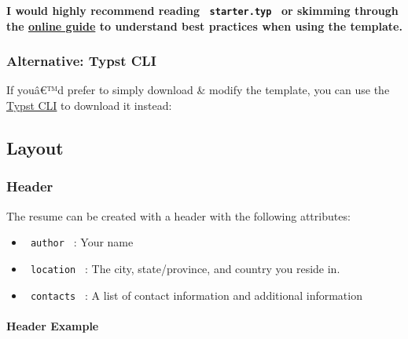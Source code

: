 \textbf{I would highly recommend reading \texttt{\ starter.typ\ } or
skimming through the
\href{https://blog.chaoticgood.computer/writing/notes/typst-resume-template}{online
guide} to understand best practices when using the template.}

\subsubsection{Alternative: Typst CLI}\label{alternative-typst-cli}

If youâ€™d prefer to simply download \& modify the template, you can use
the \href{https://github.com/typst/typst}{Typst CLI} to download it
instead:

\begin{Shaded}
\begin{Highlighting}[]
\end{Highlighting}
\end{Shaded}

\subsection{Layout}\label{layout}

\subsubsection{Header}\label{header}

The resume can be created with a header with the following attributes:

\begin{itemize}
\tightlist
\item
  \texttt{\ author\ } : Your name
\item
  \texttt{\ location\ } : The city, state/province, and country you
  reside in.
\item
  \texttt{\ contacts\ } : A list of contact information and additional
  information
\end{itemize}

\paragraph{Header Example}\label{header-example}

\begin{Shaded}
\begin{Highlighting}[]
\NormalTok{  )}
\NormalTok{)}
\end{Highlighting}
\end{Shaded}

